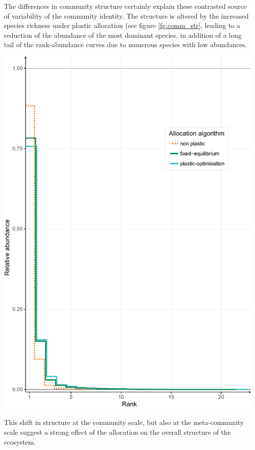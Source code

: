The differences in community structure certainly explain these contrasted source of variability of the community identity. The structure is altered by the increased species richness under plastic allocation (see figure \ref{fg:comm_str}, leading to a reduction of the abundance of the most dominant species, in addition of a long tail of the rank-abundance curves due to numerous species with low abundances.

\begin{marginfigure}%
    \includegraphics[width=1\linewidth]{./2_PP/Figures/Comm/mean_com_str2.pdf}%
  \caption[]{}
  \label{fg:comm_str}
\end{marginfigure}

This shift in structure at the community scale, but also at the meta-community scale suggest a strong effect of the allocation on the overall structure of the ecosystem.

